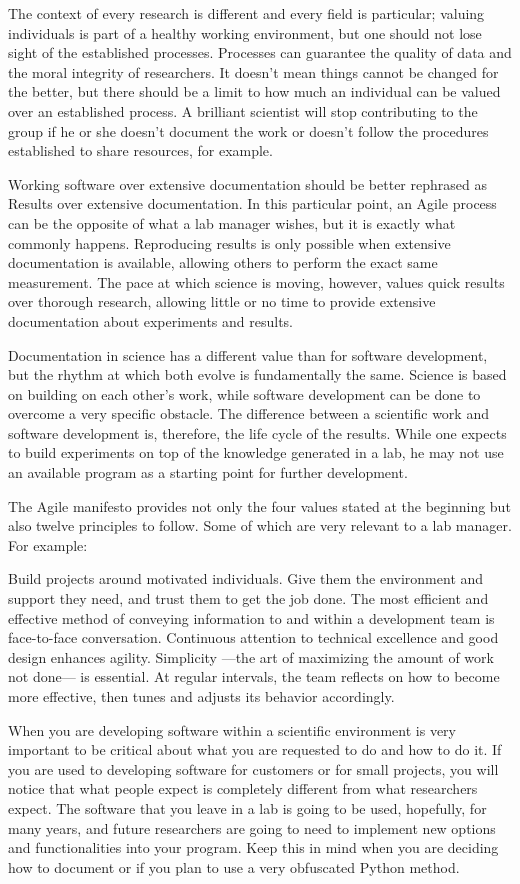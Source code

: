 The context of every research is different and every field is particular; valuing individuals is part of a healthy working environment, but one should not lose sight of the established processes. Processes can guarantee the quality of data and the moral integrity of researchers. It doesn’t mean things cannot be changed for the better, but there should be a limit to how much an individual can be valued over an established process. A brilliant scientist will stop contributing to the group if he or she doesn’t document the work or doesn’t follow the procedures established to share resources, for example.

Working software over extensive documentation should be better rephrased as Results over extensive documentation. In this particular point, an Agile process can be the opposite of what a lab manager wishes, but it is exactly what commonly happens. Reproducing results is only possible when extensive documentation is available, allowing others to perform the exact same measurement. The pace at which science is moving, however, values quick results over thorough research, allowing little or no time to provide extensive documentation about experiments and results.

Documentation in science has a different value than for software development, but the rhythm at which both evolve is fundamentally the same. Science is based on building on each other’s work, while software development can be done to overcome a very specific obstacle. The difference between a scientific work and software development is, therefore, the life cycle of the results. While one expects to build experiments on top of the knowledge generated in a lab, he may not use an available program as a starting point for further development.

The Agile manifesto provides not only the four values stated at the beginning but also twelve principles to follow. Some of which are very relevant to a lab manager. For example:

        Build projects around motivated individuals. Give them the environment and support they need, and trust them to get the job done.
        The most efficient and effective method of conveying information to and within a development team is face-to-face conversation.
        Continuous attention to technical excellence and good design enhances agility.
        Simplicity —the art of maximizing the amount of work not done— is essential.
        At regular intervals, the team reflects on how to become more effective, then tunes and adjusts its behavior accordingly.

When you are developing software within a scientific environment is very important to be critical about what you are requested to do and how to do it. If you are used to developing software for customers or for small projects, you will notice that what people expect is completely different from what researchers expect. The software that you leave in a lab is going to be used, hopefully, for many years, and future researchers are going to need to implement new options and functionalities into your program. Keep this in mind when you are deciding how to document or if you plan to use a very obfuscated Python method.
